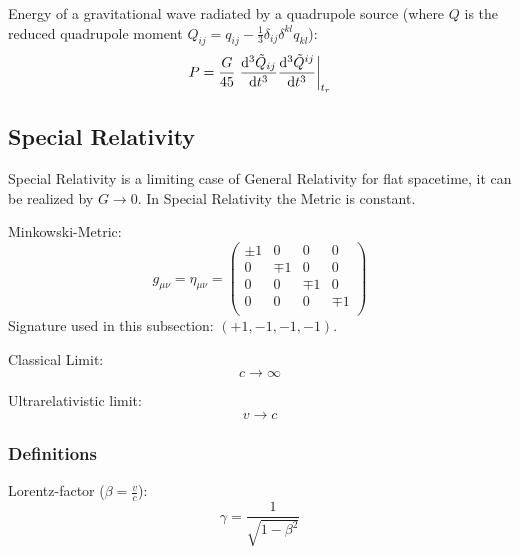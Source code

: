 			\noindent
			Energy of a gravitational wave radiated by a quadrupole source (where $Q$ is the reduced quadrupole moment $Q_{ij} = q_{ij} - \frac{1}{3}\delta_{ij}\delta^{kl}q_{kl}$):
			\begin{equation}
				P = \frac{G}{45} \eval{\dv[3]{\tilde{Q}_{ij}}{t}\dv[3]{\tilde{Q}^{ij}}{t}}_{t_r}
			\end{equation}


	\subsection{Special Relativity}
		\noindent
		Special Relativity is a limiting case of General Relativity for flat spacetime, it can be realized by $G \to 0$. In Special Relativity the Metric is constant.

		\noindent
		Minkowski-Metric:
		\begin{equation}
			g_{\mu\nu} = \eta_{\mu\nu}
			= \left( \begin{matrix}
					\pm1 & 0    & 0    & 0    \\
					0    & \mp1 & 0    & 0    \\
					0    & 0    & \mp1 & 0    \\
					0    & 0    & 0    & \mp1 \\
				\end{matrix} \right)
		\end{equation}
		Signature used in this subsection: $(+1,-1,-1,-1)$.

		\noindent
		Classical Limit:
		\begin{equation}
			c \to \infty
		\end{equation}

		\noindent
		Ultrarelativistic limit:
		\begin{equation}
			v \to c
		\end{equation}

		\subsubsection{Definitions}
			\noindent
			Lorentz-factor ($\beta = \frac{v}{c}$):
			\begin{equation}
				\gamma = \frac{1}{\sqrt{1-\beta^2}}
			\end{equation}

